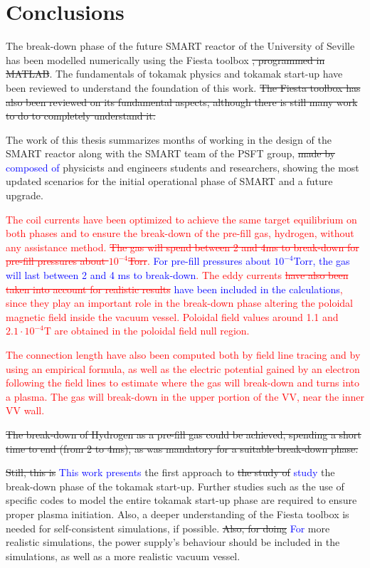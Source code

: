\documentclass[a4paper,12pt,oneside]{book}
\begin{document}
\chapter{Conclusions}

The break-down phase of the future SMART reactor of the University of Seville has been modelled numerically using the Fiesta toolbox \st{, programmed in MATLAB}. The fundamentals of tokamak physics and tokamak start-up have been reviewed to understand the foundation of this work. \st{The Fiesta toolbox has also been reviewed on its fundamental aspects, although there is still many work to do to completely understand it.}

The work of this thesis summarizes months of working in the design of the SMART reactor along with the SMART team of the PSFT group, \st{made by} \textcolor{blue}{composed of} physicists and engineers students and researchers, showing the most updated scenarios for the initial operational phase of SMART and a future upgrade. 

\textcolor{red}{The coil currents have been optimized to achieve the same target equilibrium on both phases and to ensure the break-down of the pre-fill gas, hydrogen, without any assistance method. \st{The gas will spend between 2 and 4ms to break-down for pre-fill pressures about $10^{-4}$Torr}. \textcolor{blue}{For pre-fill pressures about $10^{-4}$Torr, the gas will last between 2 and 4 ms to break-down}. The eddy currents \st{have also been taken into account for realistic results} \textcolor{blue}{have been included in the calculations}, since they play an important role in the break-down phase altering the poloidal magnetic field inside the vacuum vessel. Poloidal field values around 1.1 and $2.1\cdot 10^{-4}$T are obtained in the poloidal field null region.}

\textcolor{red}{The connection length have also been computed both by field line tracing and by using an empirical formula, as well as the electric potential gained by an electron following the field lines to estimate where the gas will break-down and turns into a plasma. The gas will break-down in the upper portion of the VV, near the inner VV wall.}

\st{The break-down of Hydrogen as a pre-fill gas could be achieved, spending a short time to end (from 2 to 4ms), as was mandatory for a suitable break-down phase.}

\st{Still, this is} \textcolor{blue}{This work presents} the first approach to \st{the study of} \textcolor{blue}{study} the break-down phase of the tokamak start-up. Further studies such as the use of specific codes to model the entire tokamak start-up phase are required to ensure proper plasma initiation. Also, a deeper understanding of the Fiesta toolbox is needed for self-consistent simulations, if possible. \st{Also, for doing} \textcolor{blue}{For} more realistic simulations, the power supply's behaviour should be included in the simulations, as well as a more realistic vacuum vessel.
\end{document}
